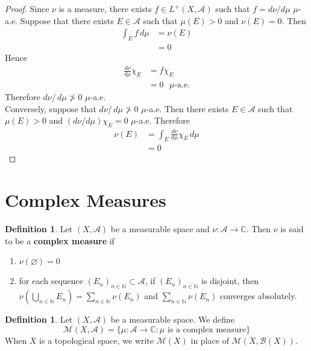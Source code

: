 \documentclass{book}
\theoremstyle{definition}
\newtheorem{defn}[definition]{Definition}
\newcommand{\C}{\mathbb{C}}
\newcommand{\N}{\mathbb{N}}
\newcommand{\MA}{\mathcal{A}}
\newcommand{\MB}{\mathcal{B}}
\newcommand{\MM}{\mathcal{M}}
\newcommand{\ld}[1]{\label{defn:#1}}
\DeclareMathOperator*{\0}{\mbf{0}}
\DeclareMathOperator*{\1}{\mbf{1}}
\newcommand{\dmu}{\, d \mu}
\begin{document}
	\begin{proof}
		Since $\nu$ is a measure, there exists $f \in L^+(X, \MA)$ such that $f = d\nu/ d\mu$ $\mu$-a.e. Suppose that there exists $E \in \MA$ such that $\mu(E) > 0$ and $\nu(E) = 0$. Then 
		\begin{align*}
			\int_E f \dmu  
			& = \nu(E) \\
			& = 0 
		\end{align*}
		Hence 
		\begin{align*}
			\frac{d \nu}{d\mu}\chi_E 
			& = f \chi_E \\
			& = 0 \text{ $\mu$-a.e.}
		\end{align*} 
		Therefore $d\nu / \dmu \not > 0$ $\mu$-a.e.\\
		Conversely, suppose that $d\nu / \dmu \not > 0$ $\mu$-a.e. Then there exists $E \in \MA$ such that $\mu(E) > 0$ and $(d \nu / d\mu)\chi_E = 0$ $\mu$-a.e. Therefore 
		\begin{align*}
			\nu(E)
			& = \int_E \frac{d \nu}{d\mu}\chi_E  \dmu \\
			& = 0
		\end{align*}
	\end{proof}
	
	
	
	
	
	
	
	
	
	
	\newpage	
	\section{Complex Measures}
	
	\begin{defn} \ld{43001} 
		Let $(X, \MA)$ be a measurable space and $\nu:\MA \rightarrow \C$. Then $\nu$ is said to be a \textbf{complex measure} if 
		\begin{enumerate}
			\item $\nu (\varnothing) = 0$
			\item for each sequence $(E_n)_{n \in \N} \subset \MA$, if $(E_n)_{n \in \N}$ is disjoint, then $\nu(\bigcup_{n \in \N} E_n) = \sum_{n \in \N} \nu(E_n)$ and $\sum_{n \in \N} \nu(E_n)$ converges absolutely. 
		\end{enumerate}
	\end{defn}
	
	\begin{defn} \ld{43002} 
	Let $(X, \MA)$ be a measurable space. We define $$\MM(X, \MA) = \{\mu:\MA \rightarrow \C: \mu \text{ is a complex measure}\}$$
	When $X$ is a topological space, we write $\MM(X)$ in place of $\MM(X, \MB(X))$.
	\end{defn}
\end{document}
